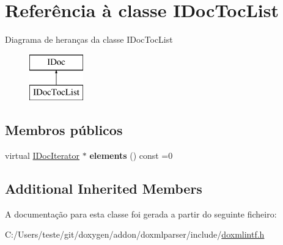 \hypertarget{class_i_doc_toc_list}{\section{Referência à classe I\-Doc\-Toc\-List}
\label{class_i_doc_toc_list}
}
Diagrama de heranças da classe I\-Doc\-Toc\-List\begin{figure}[H]
\begin{center}
\leavevmode
\includegraphics[height=2.000000cm]{class_i_doc_toc_list}
\end{center}
\end{figure}
\subsection*{Membros públicos}
\begin{DoxyCompactItemize}
\item 
\hypertarget{class_i_doc_toc_list_ad6ead2baea7fba8812ab68d4125fc932}{virtual \hyperlink{class_i_doc_iterator}{I\-Doc\-Iterator} $\ast$ {\bfseries elements} () const =0}\label{class_i_doc_toc_list_ad6ead2baea7fba8812ab68d4125fc932}

\end{DoxyCompactItemize}
\subsection*{Additional Inherited Members}


A documentação para esta classe foi gerada a partir do seguinte ficheiro\-:\begin{DoxyCompactItemize}
\item 
C\-:/\-Users/teste/git/doxygen/addon/doxmlparser/include/\hyperlink{include_2doxmlintf_8h}{doxmlintf.\-h}\end{DoxyCompactItemize}
